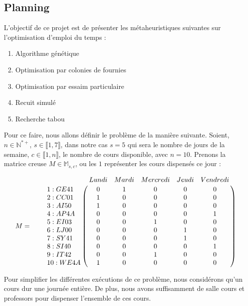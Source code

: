 

\subsection{Planning}

L'objectif de ce projet est de présenter les métaheuristiques suivantes sur l'optimisation d'emploi du temps :
\begin{enumerate}
    \item Algorithme génétique
    \item Optimisation par colonies de fournies
    \item Optimisation par essaim particulaire
    \item Recuit simulé
    \item Recherche tabou
\end{enumerate}

Pour ce faire, nous allons définir le problème de la manière suivante.
Soient, $n \in \mathbb{N}^{*+}$, $s \in \llbracket 1 ,7 \rrbracket$, dans notre cas $s = 5$ qui sera le nombre de jours de la semaine, $c \in \llbracket 1 ,n \rrbracket$, le nombre de cours disponible, avec $n = 10 $.
Prenons la matrice creuse $M \in \mathbb{M}_{s,c}$, ou les $1$ représenter les cours dispensés ce jour :

\[
    M = \qquad \bordermatrix{~  & \tikzmark{harrowleft} Lundi & Mardi & Mercredi & Jeudi
    & Vendredi\tikzmark{harrowright}  \cr
    \tikzmark{varrowtop}
    1 : GE41 & 0 & 1 & 0 & 0 & 0 \cr
    2 : CC01 & 1 & 0 & 0 & 0 & 0 \cr
    3 : AI50 & 1 & 0 & 0 & 0 & 0 \cr
    4 : AP4A & 0 & 0 & 0 & 0 & 1 \cr
    5 : EI03 & 0 & 0 & 1 & 0 & 0 \cr
    6 : LJ00 & 0 & 0 & 0 & 1 & 0 \cr
    7 : SY41 & 0 & 0 & 0 & 1 & 0 \cr
    8 : SI40 & 0 & 0 & 0 & 0 & 1 \cr
    9 : IT42 & 0 & 0 & 1 & 0 & 0 \cr
    \tikzmark{varrowbottom} 10 : WE4A & 1 & 0 & 0 & 0 & 0 \cr
    }
\]

Pour simplifier les différentes exécutions de ce problème, nous considérons qu'un cours dur une journée entière.
De plus, nous avons suffisamment de salle cours et professors pour dispenser l'ensemble de ces cours.


